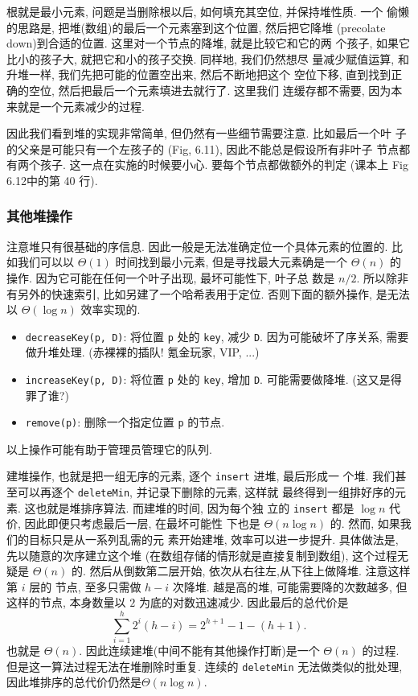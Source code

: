 \documentclass[a4paper]{ctexart}
\theoremstyle{definition}
\theoremstyle{definition}
\begin{document}

根就是最小元素, 问题是当删除根以后, 如何填充其空位, 并保持堆性质. 一个
偷懒的思路是, 把堆(数组)的最后一个元素塞到这个位置, 然后把它降堆
(precolate down)到合适的位置. 这里对一个节点的降堆, 就是比较它和它的两
个孩子, 如果它比小的孩子大, 就把它和小的孩子交换. 同样地, 我们仍然想尽
量减少赋值运算, 和升堆一样, 我们先把可能的位置空出来, 然后不断地把这个
空位下移, 直到找到正确的空位, 然后把最后一个元素填进去就行了. 这里我们
连缓存都不需要, 因为本来就是一个元素减少的过程.

因此我们看到堆的实现非常简单, 但仍然有一些细节需要注意. 比如最后一个叶
子的父亲是可能只有一个左孩子的 (Fig, 6.11), 因此不能总是假设所有非叶子
节点都有两个孩子. 这一点在实施的时候要小心. 要每个节点都做额外的判定
(课本上 Fig 6.12中的第 40 行). 

\subsubsection{其他堆操作}

注意堆只有很基础的序信息. 因此一般是无法准确定位一个具体元素的位置的.
比如我们可以以 $\Theta(1)$ 时间找到最小元素, 但是寻找最大元素确是一个
$\Theta(n)$ 的操作. 因为它可能在任何一个叶子出现, 最坏可能性下, 叶子总
数是 $n / 2$. 所以除非有另外的快速索引, 比如另建了一个哈希表用于定位.
否则下面的额外操作, 是无法以 $\Theta(\log n)$ 效率实现的.

\begin{itemize}
\item \verb|decreaseKey(p, D)|: 将位置 \verb|p| 处的 \verb|key|, 减少
  \verb|D|. 因为可能破坏了序关系, 需要做升堆处理. (赤裸裸的插队! 氪金玩家, VIP, ...)

\item \verb|increaseKey(p, D)|: 将位置 \verb|p| 处的 \verb|key|, 增加
  \verb|D|. 可能需要做降堆. (这又是得罪了谁?)

\item \verb|remove(p)|: 删除一个指定位置 \verb|p| 的节点.
\end{itemize}
以上操作可能有助于管理员管理它的队列.


建堆操作, 也就是把一组无序的元素, 逐个 \verb|insert| 进堆, 最后形成一
个堆. 我们甚至可以再逐个 \verb|deleteMin|, 并记录下删除的元素, 这样就
最终得到一组排好序的元素. 这也就是堆排序算法. 而建堆的时间, 因为每个独
立的 \verb|insert| 都是 $\log n$ 代价, 因此即便只考虑最后一层, 在最坏可能性
下也是 $\Theta(n \log n)$ 的. 然而, 如果我们的目标只是从一系列乱需的元
素开始建堆, 效率可以进一步提升. 具体做法是, 先以随意的次序建立这个堆
(在数组存储的情形就是直接复制到数组), 这个过程无疑是 $\Theta(n)$ 的.
然后从倒数第二层开始, 依次从右往左,从下往上做降堆. 注意这样第 $i$ 层的
节点, 至多只需做 $h - i$ 次降堆. 越是高的堆, 可能需要降的次数越多, 但
这样的节点, 本身数量以 $2$ 为底的对数迅速减少. 因此最后的总代价是
$$ 
\sum_{i = 1}^h 2^i(h - i) =
2^{h + 1} - 1 - (h + 1).
$$
也就是 $\Theta(n)$. 因此连续建堆(中间不能有其他操作打断)是一个
$\Theta(n)$ 的过程. 但是这一算法过程无法在堆删除时重复. 连续的
\verb|deleteMin| 无法做类似的批处理, 因此堆排序的总代价仍然是$\Theta(n
\log n)$.
\end{document}

